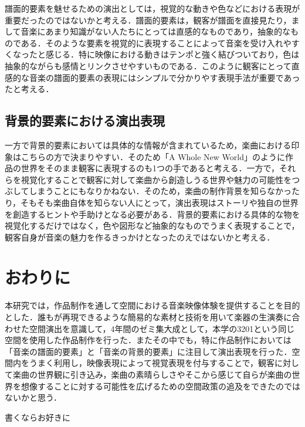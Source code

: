 譜面的要素を魅せるための演出としては，視覚的な動きや色などにおける表現が重要だったのではないかと考える．譜面的要素は，観客が譜面を直接見たり，まして音楽にあまり知識がない人たちにとっては直感的なものであり，抽象的なものである．そのような要素を視覚的に表現することによって音楽を受け入れやすくなったと感じる．特に映像における動きはテンポと強く結びついており，色は抽象的ながらも感情とリンクさせやすいものである．このように観客にとって直感的な音楽の譜面的要素の表現にはシンプルで分かりやす表現手法が重要であったと考える．

\subsection{背景的要素における演出表現}
一方で背景的要素においては具体的な情報が含まれているため，楽曲における印象はこちらの方で決まりやすい．そのため「A Whole New World」のように作品の世界をそのまま観客に表現するのも1つの手であると考える．一方で，それらを視覚化することで観客に対して楽曲から創造しうる世界や魅力の可能性をつぶしてしまうことにもなりかねない．そのため，楽曲の制作背景を知らなかったり，そもそも楽曲自体を知らない人にとって，演出表現はストーリや独自の世界を創造するヒントや手助けとなる必要がある．背景的要素における具体的な物を視覚化するだけではなく，色や図形など抽象的なものでうまく表現することで，観客自身が音楽の魅力を作るきっかけとなったのえではないかと考える．

\section{おわりに}
本研究では，作品制作を通して空間における音楽映像体験を提供することを目的とした．誰もが再現できるような簡易的な素材と技術を用いて楽器の生演奏に合わせた空間演出を意識して，4年間のゼミ集大成として，本学の3201という同じ空間を使用した作品制作を行った．またその中でも，特に作品制作においては「音楽の譜面的要素」と「音楽の背景的要素」に注目して演出表現を行った．空間内をうまく利用し，映像表現によって視覚表現を付与することで，観客に対して楽曲の世界観に引き込み，楽曲の素晴らしさやそこから感じて自らが楽曲の世界を想像することに対する可能性を広げるための空間政策の追及をできたのではないかと思う．






\begin{acknowledgment}
	書くならお好きに
\end{acknowledgment}

